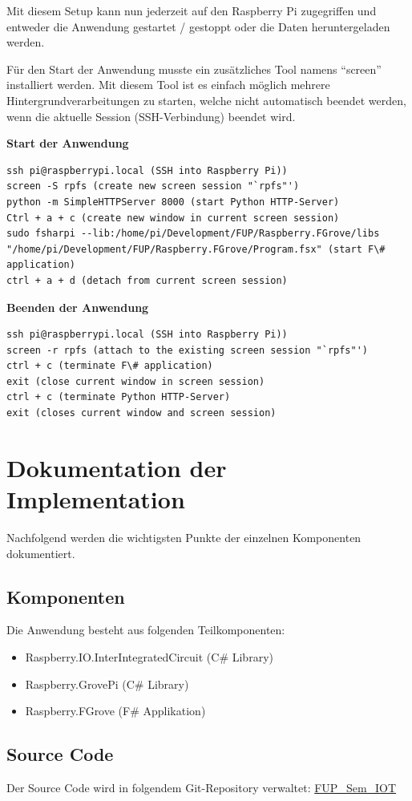 Mit diesem Setup kann nun jederzeit auf den Raspberry Pi zugegriffen und entweder die Anwendung gestartet / gestoppt oder die Daten heruntergeladen werden.

Für den Start der Anwendung musste ein zusätzliches Tool namens "`screen"' installiert werden. Mit diesem Tool ist es einfach möglich mehrere Hintergrundverarbeitungen zu starten, welche nicht automatisch beendet werden, wenn die aktuelle Session (SSH-Verbindung) beendet wird.

\textbf{Start der Anwendung}
\begin{lstlisting}
ssh pi@raspberrypi.local (SSH into Raspberry Pi))
screen -S rpfs (create new screen session "`rpfs"')
python -m SimpleHTTPServer 8000 (start Python HTTP-Server)
Ctrl + a + c (create new window in current screen session)
sudo fsharpi --lib:/home/pi/Development/FUP/Raspberry.FGrove/libs "/home/pi/Development/FUP/Raspberry.FGrove/Program.fsx" (start F\# application)
ctrl + a + d (detach from current screen session)
\end{lstlisting}

\textbf{Beenden der Anwendung}
\begin{lstlisting}
ssh pi@raspberrypi.local (SSH into Raspberry Pi))
screen -r rpfs (attach to the existing screen session "`rpfs"')
ctrl + c (terminate F\# application)
exit (close current window in screen session)
ctrl + c (terminate Python HTTP-Server)
exit (closes current window and screen session)
\end{lstlisting}

\section{Dokumentation der Implementation}
\label{sec:AnalyseCollection:ImplDoc}
Nachfolgend werden die wichtigsten Punkte der einzelnen Komponenten dokumentiert.

\subsection{Komponenten}
Die Anwendung besteht aus folgenden Teilkomponenten:
\begin{itemize}
\item Raspberry.IO.InterIntegratedCircuit (C\# Library)
\item Raspberry.GrovePi (C\# Library)
\item Raspberry.FGrove (F\# Applikation)
\end{itemize}

\subsection{Source Code}
Der Source Code wird in folgendem Git-Repository verwaltet: \hyperlink{https://github.com/Liechtathlet/FUP_Sem_IOT}{FUP\_Sem\_IOT}

